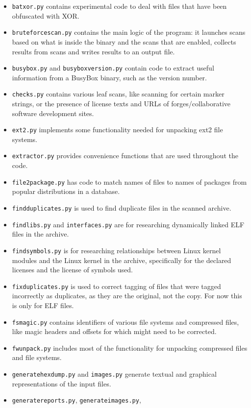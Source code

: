 \documentclass[10pt,a4paper]{article}
\begin{document}
\begin{itemize}
\item \texttt{batxor.py} contains experimental code to deal with files that
have been obfuscated with XOR.
\item \texttt{bruteforcescan.py} contains the main logic of the program: it
launches scans based on what is inside the binary and the scans that are
enabled, collects results from scans and writes results to an output file.
\item \texttt{busybox.py} and \texttt{busyboxversion.py} contain code to
extract useful information from a BusyBox binary, such as the version number.
\item \texttt{checks.py} contains various leaf scans, like scanning for certain
marker strings, or the presence of license texts and URLs of
forges/collaborative software development sites.
\item \texttt{ext2.py} implements some functionality needed for unpacking ext2
file systems.
\item \texttt{extractor.py} provides convenience functions that are used
throughout the code.
\item \texttt{file2package.py} has code to match names of files to names of
packages from popular distributions in a database.
\item \texttt{findduplicates.py} is used to find duplicate files in the scanned
archive.
\item \texttt{findlibs.py} and \texttt{interfaces.py} are for researching
dynamically linked ELF files in the archive.
\item \texttt{findsymbols.py} is for researching relationships between Linux
kernel modules and the Linux kernel in the archive, specifically for the
declared licenses and the license of symbols used.
\item \texttt{fixduplicates.py} is used to correct tagging of files that were
tagged incorrectly as duplicates, as they are the original, not the copy. For
now this is only for ELF files.
\item \texttt{fsmagic.py} contains identifiers of various file systems and
compressed files, like magic headers and offsets for which might need to be
corrected.
\item \texttt{fwunpack.py} includes most of the functionality for unpacking
compressed files and file systems.
\item \texttt{generatehexdump.py} and \texttt{images.py} generate textual and
graphical representations of the input files.
\item \texttt{generatereports.py}, \texttt{generateimages.py},

\end{itemize}
\end{document}
